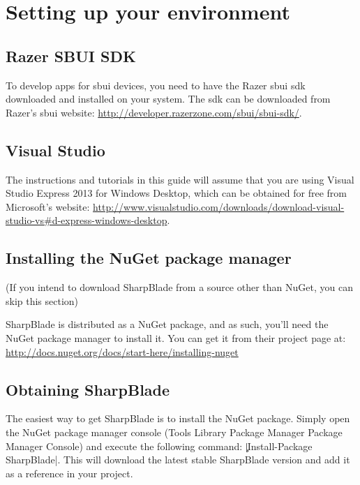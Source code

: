 \chapter{Setting up your environment\label{setup}}
\section{Razer SBUI SDK}
To develop apps for \gls{sbui} devices, you need to have the Razer \gls{sbui} \gls{sdk} downloaded and installed on your system. The \gls{sdk} can be downloaded from Razer's \gls{sbui} website: \url{http://developer.razerzone.com/sbui/sbui-sdk/}.

\section{Visual Studio}
The instructions and tutorials in this guide will assume that you are using Visual Studio Express 2013 for Windows Desktop, which can be obtained for free from Microsoft's website: \url{http://www.visualstudio.com/downloads/download-visual-studio-vs#d-express-windows-desktop}.

\section{Installing the NuGet package manager}
(If you intend to download SharpBlade from a source other than NuGet, you can skip this section)

SharpBlade is distributed as a NuGet package, and as such, you'll need the NuGet package manager to install it. You can get it from their project page at: \url{http://docs.nuget.org/docs/start-here/installing-nuget}

\section{Obtaining SharpBlade}
The easiest way to get SharpBlade is to install the NuGet package. Simply open the NuGet package manager console (Tools \rarr Library Package Manager \rarr Package Manager Console) and execute the following command: \c|Install-Package SharpBlade|. This will download the latest stable SharpBlade version and add it as a reference in your project.
